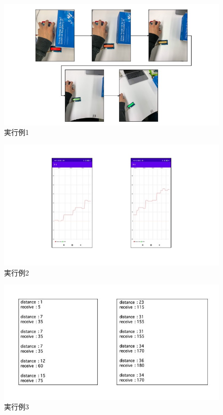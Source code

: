 \documentclass[dvipdfmx,autodetect-engine,titlepage]{jsarticle}
\begin{document}
\begin{figure}[h]
    \centering
    \includegraphics[scale=0.5]{実行例1.jpg}
    \caption{実行例1}
  \end{figure}

  \begin{figure}[h]
    \centering
    \includegraphics[scale=0.5]{実行例2.jpg}
    \caption{実行例2}
  \end{figure}

  \begin{figure}[h]
    \centering
    \includegraphics[scale=0.5]{実行例3.jpg}
    \caption{実行例3}
  \end{figure}
\end{document}
